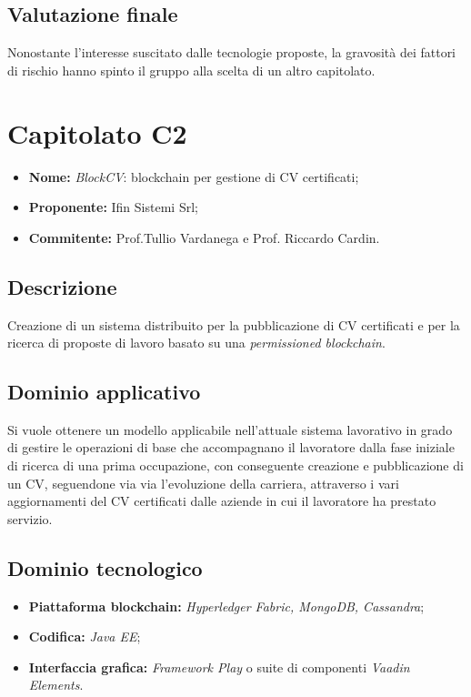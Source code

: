 \documentclass[openany,12pt,a4paper]{report}
\begin{document}
	\subsection{Valutazione finale}

	Nonostante l'interesse suscitato dalle tecnologie proposte, la gravosità dei fattori di rischio hanno spinto il gruppo alla scelta di un altro capitolato.


	\section{Capitolato C2}

	\begin{itemize}
		\item \textbf{Nome:} \textit{BlockCV}: blockchain per gestione di CV certificati;
		\item \textbf{Proponente:} Ifin Sistemi Srl;
		\item \textbf{Commitente:} Prof.Tullio Vardanega e Prof. Riccardo Cardin.
	\end{itemize}

	\subsection{Descrizione}

	Creazione di un sistema distribuito per la pubblicazione di CV certificati e per la ricerca di proposte di lavoro basato su una \textit{permissioned blockchain}.

	\subsection{Dominio applicativo}

	Si vuole ottenere un modello applicabile nell'attuale sistema lavorativo in grado di gestire le operazioni di base che accompagnano il lavoratore dalla fase iniziale di ricerca di una prima occupazione, con conseguente creazione e pubblicazione di un CV, seguendone via via l’evoluzione della carriera, attraverso i vari aggiornamenti del CV certificati dalle aziende in cui il lavoratore ha prestato servizio.

	\subsection{Dominio tecnologico}

	\begin{itemize}
		\item \textbf{Piattaforma blockchain:} \textit{Hyperledger Fabric, MongoDB, Cassandra};

		\item \textbf{Codifica:} \textit{Java EE};

		\item \textbf{Interfaccia grafica:} \textit{Framework Play} o suite di componenti \textit{Vaadin Elements}.
	\end{itemize}
\end{document}
